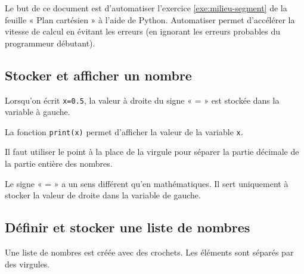

\AdvanceDate[0]


\pagestyle{fancy}
\fancyhead[R]{\today}

Le but de ce document est d'automatiser l'exercice \ref{exe:milieu-segment} de la feuille « Plan cartésien » à l'aide de Python.
Automatiser permet d'accélérer la vitesse de calcul en évitant les erreurs (en ignorant les erreurs probables du programmeur débutant).

\setcounter{Exercise}{11}


\setlength\columnsep{30pt}

\subsection*{Stocker et afficher un nombre}

\begin{multicols}{3}
	\noindent
	Lorsqu'on écrit \texttt{x=0.5}, la valeur à droite du signe « = » est stockée dans la variable à gauche.
	
	\noindent
	La fonction \texttt{print(x)} permet d'afficher la valeur de la variable \texttt{x}.

	\columnbreak
	\centering
	\begin{minipage}{.1\textwidth}
	\end{minipage}
\end{multicols}

\warning Il faut utiliser le point à la place de la virgule pour séparer la partie décimale de la partie entière des nombres.

\warning Le signe « = » a un sens différent qu'en mathématiques. Il sert uniquement à stocker la valeur de droite dans la variable de gauche.


\subsection*{Définir et stocker une liste de nombres}

\begin{multicols}{2}
	Une liste de nombres est créée avec des crochets. Les éléments sont séparés par des virgules.

	\columnbreak
	\centering
	\begin{minipage}{.2\textwidth}
	\end{minipage}
\end{multicols}

